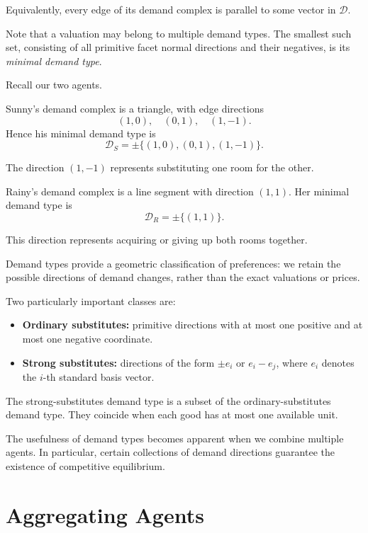 \documentclass[../../main.tex]{subfiles}
\begin{document}
Equivalently, every edge of its demand complex is parallel
to some vector in $\mathcal D$.

Note that a valuation may belong to multiple demand types.
The smallest such set, consisting of all primitive facet
normal directions and their negatives, is its
\textit{minimal demand type}.

\begin{example}
    Recall our two agents.

    Sunny's demand complex is a triangle, with edge
    directions
    \[
        (1,0),\quad (0,1),\quad (1,-1).
    \]
    Hence his minimal demand type is
    \[
        \mathcal D_S=\pm\{(1,0),(0,1),(1,-1)\}.
    \]

    The direction $(1,-1)$ represents substituting one
    room for the other.

    Rainy's demand complex is a line segment with
    direction $(1,1)$. Her minimal demand type is
    \[
        \mathcal D_R=\pm\{(1,1)\}.
    \]

    This direction represents acquiring or giving up
    both rooms together.
\end{example}

Demand types provide a geometric classification of
preferences: we retain the possible directions of demand
changes, rather than the exact valuations or prices.

Two particularly important classes are:

\begin{itemize}
    \item \textbf{Ordinary substitutes:} primitive directions
    with at most one positive and at most one negative
    coordinate.
    \item \textbf{Strong substitutes:} directions of the form
    $\pm e_i$ or $e_i-e_j$, where $e_i$ denotes the
    $i$-th standard basis vector.
\end{itemize}

\begin{rmk}
    The strong-substitutes demand type is a subset of the
    ordinary-substitutes demand type. They coincide when
    each good has at most one available unit.
    
    The usefulness of demand types becomes apparent when
    we combine multiple agents. In particular, certain
    collections of demand directions guarantee the existence
    of competitive equilibrium. 
\end{rmk}


\section{Aggregating Agents}
\end{document}
